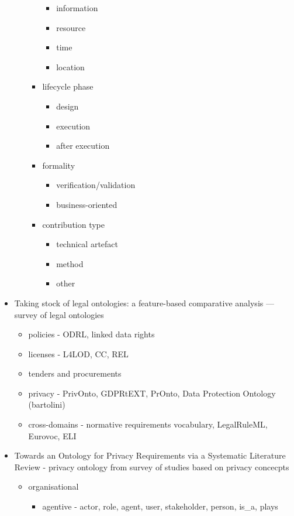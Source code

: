 \begin{itemize}
\begin{itemize}
\begin{itemize}
\begin{itemize}
			\item information
			\item resource
			\item time
			\item location
			\end{itemize}
		\item lifecycle phase
			\begin{itemize}
			\item design
			\item execution
			\item after execution
			\end{itemize}
		\item formality
			\begin{itemize}
			\item verification/validation
			\item business-oriented
			\end{itemize}
		\item contribution type
			\begin{itemize}
			\item technical artefact
			\item method
			\item other
			\end{itemize}
		\end{itemize}
	\end{itemize}
\item Taking stock of legal ontologies: a feature-based comparative analysis — survey of legal ontologies
	\begin{itemize}
	\item policies - ODRL, linked data rights
	\item licenses - L4LOD, CC, REL
	\item tenders and procurements
	\item privacy - PrivOnto, GDPRtEXT, PrOnto, Data Protection Ontology (bartolini)
	\item cross-domains - normative requirements vocabulary, LegalRuleML, Eurovoc, ELI
	\end{itemize}
\item Towards an Ontology for Privacy Requirements via a Systematic Literature Review - privacy ontology from survey of studies based on privacy concecpts
	\begin{itemize}
	\item organisational
		\begin{itemize}
		\item agentive - actor, role, agent, user, stakeholder, person, is\_a, plays

\end{itemize}
\end{itemize}
\end{itemize}
